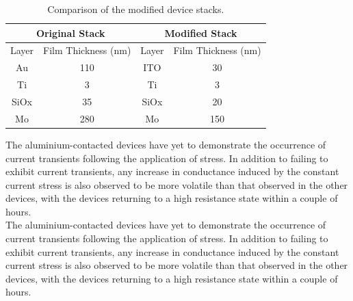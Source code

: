 \begin{table}[ht]
    \caption{Comparison of the modified device stacks.}
    \centering
    \begin{tabular}{|cc|cc|}
    \hline
    \multicolumn{2}{|c|}{Original Stack}              & \multicolumn{2}{c|}{Modified Stack}              \\ \hline
    \multicolumn{1}{|c|}{Layer} & Film Thickness (nm) & \multicolumn{1}{c|}{Layer} & Film Thickness (nm) \\ \hline
    \multicolumn{1}{|c|}{Au}    & 110                 & \multicolumn{1}{c|}{ITO}   & 30                  \\ \hline
    \multicolumn{1}{|c|}{Ti}    & 3                   & \multicolumn{1}{c|}{Ti}    & 3                   \\ \hline
    \multicolumn{1}{|c|}{SiOx}  & 35                  & \multicolumn{1}{c|}{SiOx}  & 20                  \\ \hline
    \multicolumn{1}{|c|}{Mo}    & 280                 & \multicolumn{1}{c|}{Mo}    & 150                 \\ \hline
    \end{tabular}
    \label{table:5a}
\end{table}
    
\noindent The aluminium-contacted devices have yet to demonstrate the occurrence of current transients following the application of stress. In addition to failing to exhibit current transients, any increase in conductance induced by the constant current stress is also observed to be more volatile than that observed in the other devices, with the devices returning to a high resistance state within a couple of hours.\\


\noindent The aluminium-contacted devices have yet to demonstrate the occurrence of current transients following the application of stress. In addition to failing to exhibit current transients, any increase in conductance induced by the constant current stress is also observed to be more volatile than that observed in the other devices, with the devices returning to a high resistance state within a couple of hours.\\

